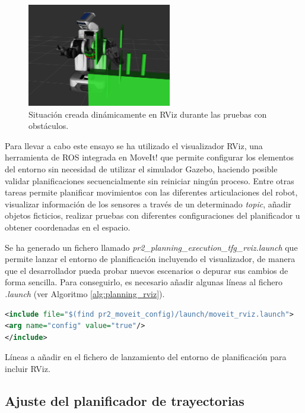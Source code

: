 \documentclass[12pt,spanish,chapterprefix, numbers=noenddot]{book}
\numberwithin{equation}{section}
\numberwithin{figure}{section}
\begin{document}
\begin{figure}[hbt!]
\centering
\includegraphics[height=4.5cm]{Figs/RVIZ.png}
\par
\caption{\label{fig:rviz}Situación creada dinámicamente en RViz durante las pruebas con obstáculos.}
\end{figure}

Para llevar a cabo este ensayo se ha utilizado el visualizador RViz, una herramienta de ROS integrada en MoveIt! que permite configurar los elementos del entorno sin necesidad de utilizar el simulador Gazebo, haciendo posible validar planificaciones secuencialmente sin reiniciar ningún proceso. Entre otras tareas permite planificar movimientos con las diferentes articulaciones del robot, visualizar información de los sensores a través de un determinado \textit{topic}, añadir objetos ficticios, realizar pruebas con diferentes configuraciones del planificador u obtener coordenadas en el espacio. 

Se ha generado un fichero llamado \textit{pr2\_planning\_execution\_tfg\_rviz.launch} que permite lanzar el entorno de planificación incluyendo el visualizador, de manera que el desarrollador pueda probar nuevos escenarios o depurar sus cambios de forma sencilla. Para conseguirlo, es necesario añadir algunas líneas al fichero \textit{.launch} (ver Algoritmo \ref{alg:planning_rviz}).  %

\begin{algorithm}[htb!]
	\begin{lstlisting}[breaklines=true,language=xml] 
<include file="$(find pr2_moveit_config)/launch/moveit_rviz.launch">
<arg name="config" value="true"/>
</include>
	\end{lstlisting}
\caption{\label{alg:planning_rviz}Líneas a añadir en el fichero de lanzamiento del entorno de planificación para incluir RViz.}
\end{algorithm}
\newpage
\subsection{Ajuste del planificador de trayectorias}
\end{document}
